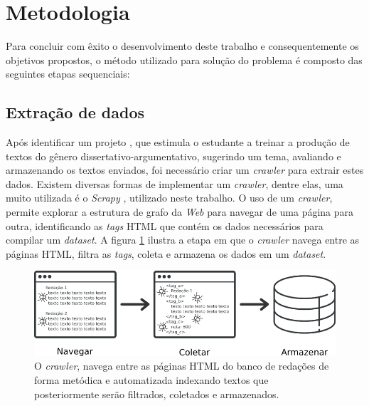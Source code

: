 \section{Metodologia}

Para concluir com êxito o desenvolvimento deste trabalho e consequentemente os 
objetivos propostos, o método utilizado para solução do problema é composto das 
seguintes etapas sequenciais:



\subsection{Extração de dados}

Após identificar um projeto \cite{brasil_escola}, que estimula o estudante a 
treinar a produção de textos do gênero dissertativo-argumentativo, sugerindo 
um tema, avaliando e armazenando os textos enviados, foi necessário criar um 
\textit{crawler} para extrair estes dados. Existem diversas formas de 
implementar um \textit{crawler}, dentre elas, uma muito utilizada é o 
\textit{Scrapy} \cite{scrapy}, utilizado neste trabalho. O uso de um 
\textit{crawler}, permite explorar a estrutura de grafo da \textit{Web} para 
navegar de uma página para outra, identificando as \textit{tags} HTML que 
contém os dados necessários para compilar um \textit{dataset}. A figura 
\ref{figure:metodologia_1} ilustra a etapa em que o \textit{crawler} navega 
entre as páginas HTML, filtra as \textit{tags}, coleta e armazena os dados em 
um \textit{dataset}.

\begin{figure}[H]
\begin{center}
    \includegraphics[scale=0.70]{images/metodologia_1.png}
\end{center}
\caption{O \textit{crawler}, navega entre as páginas HTML do banco de redações 
de forma metódica e automatizada indexando textos que posteriormente serão 
filtrados, coletados e armazenados.}
\label{figure:metodologia_1}
\end{figure}


